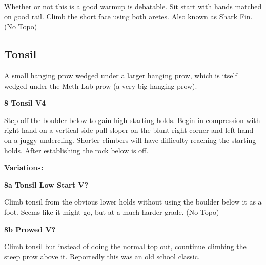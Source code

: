 \begin{multicols}{2}
			\begin{adjustwidth}{0.5cm}{}			
			Whether or not this is a good warmup is debatable. Sit start with hands matched on good rail. Climb the short face using both aretes. Also known as Shark Fin. (No Topo)
			\end{adjustwidth}
			
			
		


		\needspace{1.5cm}
		\subsection*{Tonsil}\label{bf:Tonsil}
		A small hanging prow wedged under a larger hanging prow, which is itself wedged under the Meth Lab prow (a very big hanging prow).\\
	
		
			
			\needspace{1.5cm}
\label{rt:Tonsil}
\colorbox{RoyalBlue!20}{
\parbox{0.95\linewidth}{
\textbf{
8 Tonsil V4  
}}}

			\begin{adjustwidth}{0.5cm}{}			
			Step off the boulder below to gain high starting holds. Begin in compression with right hand on a vertical side pull sloper on the blunt right corner and left hand on a juggy undercling.  Shorter climbers will have difficulty reaching the starting holds. After establishing the rock below is off.
			\end{adjustwidth}
			
				\begin{adjustwidth}{0.5cm}{}				
				\needspace{3cm}
				\textbf{Variations:} \newline
					
					\needspace{1.5cm}
\label{vr:Tonsil Low Start}
\colorbox{black!20}{
\parbox{0.95\linewidth}{
\textbf{
8a Tonsil Low Start V?  
}}}

					\begin{adjustwidth}{0.5cm}{}			
					Climb tonsil from the obvious lower holds without using the boulder below it as a foot. Seems like it might go, but at a much harder grade. (No Topo)
					\end{adjustwidth}
					
					
					
					\needspace{1.5cm}
\label{vr:Prowed}
\colorbox{black!20}{
\parbox{0.95\linewidth}{
\textbf{
8b Prowed V?  \warn\warn
}}}

					\begin{adjustwidth}{0.5cm}{}			
					Climb tonsil but instead of doing the normal top out, countinue climbing the steep prow above it. Reportedly this was an old school classic.
					\end{adjustwidth}
					

\end{adjustwidth}
\end{multicols}
